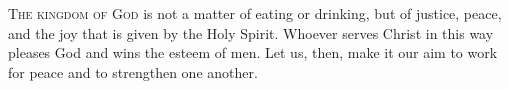 
\lettrine{T}{he kingdom of God} is not a matter of eating or drinking, but of justice, peace, and the joy that is given by the Holy Spirit. Whoever serves Christ in this way pleases God and wins the esteem of men. Let us, then, make it our aim to work for peace and to strengthen one another.
